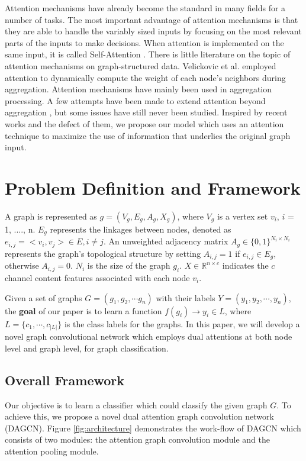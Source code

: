 \documentclass[conference]{IEEEtran}
\begin{document}
        Attention mechanisms have already become the standard in many fields for a number of tasks\cite{bahdanau2014neural,shen2017disan}. The most important advantage of attention mechanisms is that they are able to handle the variably sized inputs by focusing on the most relevant parts of the inputs to make decisions. When attention is implemented on the same input, it is called Self-Attention \cite{lin2017structured}. There is little literature on the topic of attention mechanisms on graph-structured data. Velickovic et al.\cite{velickovic2017graph} employed attention to dynamically compute the weight of each node's neighbors during aggregation. Attention mechanisms have mainly been used in aggregation processing. A few attempts have been made to extend attention beyond aggregation \cite{lee2018graph,abu2018watch}, but some issues have still never been studied. Inspired by recent works and the defect of them, we propose our model which uses an attention technique to maximize the use of information that underlies the original graph input.
	
	\section{Problem Definition and Framework}
	   A graph is represented as $g=(V_g, E_g, A_g, X_g)$, where $V_g$ is a vertex set {$v_i$}, $i$ = 1, ...., n. $E_g$ represents the linkages between nodes, denoted as $e_{i,j}=<v_i, v_j> \in E, i\neq j$. An unweighted adjacency matrix $A_g \in \lbrace 0, 1\rbrace^{N_i \times N_i}$ represents the graph's topological structure by setting $A_{i,j}=1$ if $e_{i,j} \in E_g$, otherwise $A_{i,j} = 0$. $N_i$ is the size of the graph $g_i$. $X \in \mathbb{R}^{n \times c}$ indicates the $c$ channel content features associated with each node $v_i$.
	    
	   Given a set of graphs $G = (g_1, g_2, \cdots g_n)$ with their labels $Y=(y_1, y_2, \cdots, y_n)$, the \textbf{goal} of our paper is to learn a function $f(g_i) \to y_i \in L$, where $L=\{c_1,\cdots, c_{|L|}\}$ is the class labels for the graphs. In this paper, we will develop a novel graph convolutional network which employs dual attentions at both node level and graph level, for graph classification.
	   
	   \subsection{Overall Framework}
	   Our objective is to learn a classifier which could classify the given graph $G$. To achieve this, we propose a novel dual attention graph convolution network (DAGCN). Figure \ref{fig:architecture} demonstrates the work-flow of DAGCN which consists of two modules: the attention graph convolution module and the attention pooling module.
	   
\end{document}
